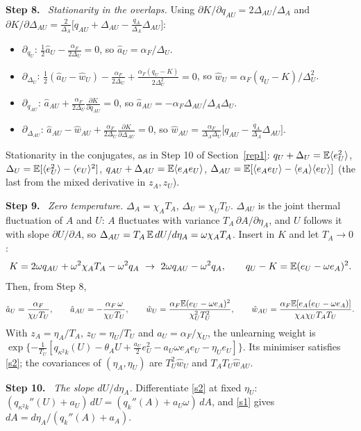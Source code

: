 \documentclass[10pt]{article}
\newcommand{\step}[1]{\par\smallskip\textbf{Step #1.}\ }
\begin{document}
\step8 \emph{Stationarity in the overlaps.} Using $\partial K/\partial q_{AU}=2\Delta_{AU}/\Delta_A$ and $\partial K/\partial\Delta_{AU}=\frac2{\Delta_A}\big[q_{AU}+\Delta_{AU}-\frac{q_A}{\Delta_A}\Delta_{AU}\big]$:
\begin{itemize}[nosep,leftmargin=1.2em]
\item $\partial_{q_U}$: $\frac12\hat a_U-\frac{\alpha_F}{2\Delta_U}=0$, so $\hat a_U=\alpha_F/\Delta_U$.
\item $\partial_{\Delta_U}$: $\frac12(\hat a_U-\hat w_U)-\frac{\alpha_F}{2\Delta_U}+\frac{\alpha_F(q_U-K)}{2\Delta_U^2}=0$, so $\hat w_U=\alpha_F(q_U-K)/\Delta_U^2$.
\item $\partial_{q_{AU}}$: $\hat a_{AU}+\frac{\alpha_F}{2\Delta_U}\frac{\partial K}{\partial q_{AU}}=0$, so $\hat a_{AU}=-\alpha_F\Delta_{AU}/\Delta_A\Delta_U$.
\item $\partial_{\Delta_{AU}}$: $\hat a_{AU}-\hat w_{AU}+\frac{\alpha_F}{2\Delta_U}\frac{\partial K}{\partial\Delta_{AU}}=0$, so $\hat w_{AU}=\frac{\alpha_F}{\Delta_A\Delta_U}\big[q_{AU}-\frac{q_A}{\Delta_A}\Delta_{AU}\big]$.
\end{itemize}
Stationarity in the conjugates, as in Step 10 of Section~\ref{rep1}: $q_U+\Delta_U=\mathbb E\langle e_U^2\rangle$, $\Delta_U=\mathbb E[\langle e_U^2\rangle-\langle e_U\rangle^2]$, $q_{AU}+\Delta_{AU}=\mathbb E\langle e_Ae_U\rangle$, $\Delta_{AU}=\mathbb E[\langle e_Ae_U\rangle-\langle e_A\rangle\langle e_U\rangle]$ (the last from the mixed derivative in $z_A,z_U$).
\step9 \emph{Zero temperature.} $\Delta_A=\chi_AT_A$, $\Delta_U=\chi_UT_U$. $\Delta_{AU}$ is the joint thermal fluctuation of $A$ and $U$: $A$ fluctuates with variance $T_A\,\partial A/\partial\eta_A$, and $U$ follows it with slope $\partial U/\partial A$, so $\Delta_{AU}=T_A\,\mathbb E\,dU/d\eta_A=\omega\chi_AT_A$. Insert in $K$ and let $T_A\to0$:
\[
K=2\omega q_{AU}+\omega^2\chi_AT_A-\omega^2q_A\ \to\ 2\omega q_{AU}-\omega^2q_A,\qquad q_U-K=\mathbb E(e_U-\omega e_A)^2 .
\]
Then, from Step 8,
\[
\hat a_U=\frac{\alpha_F}{\chi_UT_U},\qquad\hat a_{AU}=-\frac{\alpha_F\,\omega}{\chi_UT_U},\qquad\hat w_U=\frac{\alpha_F\mathbb E(e_U-\omega e_A)^2}{\chi_U^2T_U^2},\qquad\hat w_{AU}=\frac{\alpha_F\mathbb E[e_A(e_U-\omega e_A)]}{\chi_A\chi_UT_AT_U}.
\]
With $z_A=\eta_A/T_A$, $z_U=\eta_U/T_U$ and $a_U=\alpha_F/\chi_U$, the unlearning weight is $\exp\{-\frac1{T_U}[q_{\kappa^2k}(U)-\theta_AU+\frac{a_U}2e_U^2-a_U\omega e_Ae_U-\eta_Ue_U]\}$. Its minimiser satisfies \eqref{s2}; the covariances of $(\eta_A,\eta_U)$ are $T_U^2\hat w_U$ and $T_AT_U\hat w_{AU}$.
\step{10} \emph{The slope $dU/d\eta_A$.} Differentiate \eqref{s2} at fixed $\eta_U$: $(q_{\kappa^2k}''(U)+a_U)\,dU=(q_k''(A)+a_U\omega)\,dA$, and \eqref{s1} gives $dA=d\eta_A/(q_k''(A)+a_A)$.
\end{document}
